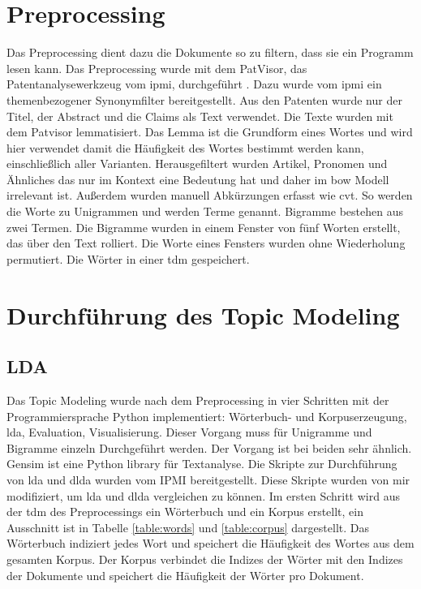 \section{Preprocessing}
Das Preprocessing dient dazu die Dokumente so zu filtern, dass sie ein Programm lesen kann. Das Preprocessing wurde mit dem PatVisor\textregistered, das Patentanalysewerkzeug vom \gls{ipmi}, durchgeführt \parencite[vgl.][S. 159-164]{walter2016patentmanagement}. Dazu wurde vom \gls{ipmi} ein themenbezogener Synonymfilter bereitgestellt. Aus den Patenten wurde nur der Titel, der Abstract und die Claims als Text verwendet. Die Texte wurden mit dem Patvisor lemmatisiert. Das Lemma ist die Grundform eines Wortes und wird hier verwendet damit die Häufigkeit des Wortes bestimmt werden kann, einschließlich aller Varianten. Herausgefiltert wurden Artikel, Pronomen und Ähnliches das nur im Kontext eine Bedeutung hat und daher im \gls{bow} Modell irrelevant ist. Außerdem wurden manuell Abkürzungen erfasst wie \gls{cvt}. So werden die Worte zu Unigrammen und werden Terme genannt. Bigramme bestehen aus zwei Termen. Die Bigramme wurden in einem Fenster von fünf Worten erstellt, das über den Text rolliert. Die Worte eines Fensters wurden ohne Wiederholung permutiert. Die Wörter in einer \gls{tdm} gespeichert.

\section{Durchführung des Topic Modeling}

\subsection{LDA}
Das Topic Modeling wurde nach dem Preprocessing in vier Schritten mit der Programmiersprache Python implementiert: Wörterbuch- und Korpuserzeugung, \gls{lda}, Evaluation, Visualisierung. Dieser Vorgang muss für Unigramme und Bigramme einzeln Durchgeführt werden. Der Vorgang ist bei beiden sehr ähnlich.  Gensim ist eine Python library für Textanalyse. Die Skripte zur Durchführung von \gls{lda} und \gls{dlda} wurden vom IPMI bereitgestellt. Diese Skripte wurden von mir modifiziert, um \gls{lda} und \gls{dlda} vergleichen zu können. Im ersten Schritt wird aus der \gls{tdm} des Preprocessings ein Wörterbuch und ein Korpus erstellt, ein Ausschnitt ist in Tabelle \ref{table:words} und \ref{table:corpus} dargestellt. Das Wörterbuch indiziert jedes Wort und speichert die Häufigkeit des Wortes aus dem gesamten Korpus. Der Korpus verbindet die Indizes der Wörter mit den Indizes der Dokumente und speichert die Häufigkeit der Wörter pro Dokument.

